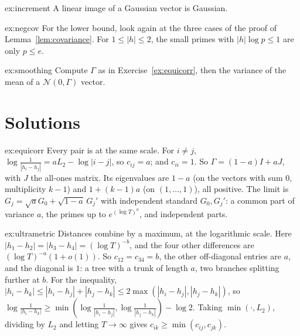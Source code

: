 \begin{hint}{ex:increment}
A linear image of a Gaussian vector is Gaussian.
\end{hint}

\begin{hint}{ex:negcov}
For the lower bound, look again at the three cases of the proof of Lemma~\ref{lem:covariance}. For $1\le|h|\le2$, the small primes with $|h|\log p\le1$ are only $p\le e$.
\end{hint}

\begin{hint}{ex:smoothing}
Compute $\Gamma$ as in Exercise~\ref{ex:equicorr}, then the variance of the mean of a $\mathcal N(0,\Gamma)$ vector.
\end{hint}

\section{Solutions}

\begin{solution}{ex:equicorr}
\idea Every pair is at the same scale.
\writeup For $i\ne j$, $\log\frac1{|h_i-h_j|}=aL_2-\log|i-j|$, so $c_{ij}=a$; and $c_{ii}=1$. So $\Gamma=(1-a)I+aJ$, with $J$ the all-ones matrix. Its eigenvalues are $1-a$ (on the vectors with sum $0$, multiplicity $k-1$) and $1+(k-1)a$ (on $(1,\dots,1)$), all positive. The limit is $G_j=\sqrt aG_0+\sqrt{1-a}\,G_j'$ with independent standard $G_0,G_j'$: a common part of variance $a$, the primes up to $e^{(\log T)^a}$, and independent parts.
\end{solution}

\begin{solution}{ex:ultrametric}
\idea Distances combine by a maximum, at the logarithmic scale.
\writeup Here $|h_1-h_2|=|h_3-h_4|=(\log T)^{-b}$, and the four other differences are $(\log T)^{-a}(1+o(1))$. So $c_{12}=c_{34}=b$, the other off-diagonal entries are $a$, and the diagonal is $1$: a tree with a trunk of length $a$, two branches splitting further at $b$. For the inequality, $|h_i-h_k|\le|h_i-h_j|+|h_j-h_k|\le2\max(|h_i-h_j|,|h_j-h_k|)$, so $\log\frac1{|h_i-h_k|}\ge\min(\log\frac1{|h_i-h_j|},\log\frac1{|h_j-h_k|})-\log2$. Taking $\min(\cdot,L_2)$, dividing by $L_2$ and letting $T\to\infty$ gives $c_{ik}\ge\min(c_{ij},c_{jk})$.
\end{solution}

